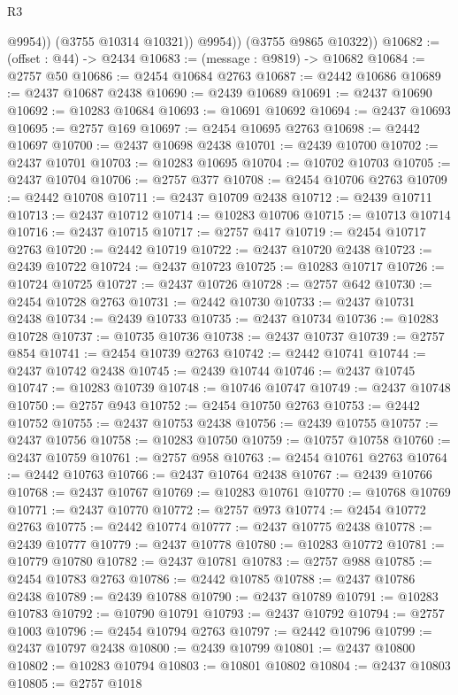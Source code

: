\begin{lexlean}{R3}
\begin{coremodule}
                @9954))
            (@3755 @10314 @10321))
          @9954))
      (@3755 @9865 @10322))
@10682 := (offset : @44) -> @2434
@10683 := (message : @9819) -> @10682
@10684 := @2757 @50
@10686 := @2454 @10684 @2763
@10687 := @2442 @10686
@10689 := @2437 @10687 @2438
@10690 := @2439 @10689
@10691 := @2437 @10690
@10692 := @10283 @10684
@10693 := @10691 @10692
@10694 := @2437 @10693
@10695 := @2757 @169
@10697 := @2454 @10695 @2763
@10698 := @2442 @10697
@10700 := @2437 @10698 @2438
@10701 := @2439 @10700
@10702 := @2437 @10701
@10703 := @10283 @10695
@10704 := @10702 @10703
@10705 := @2437 @10704
@10706 := @2757 @377
@10708 := @2454 @10706 @2763
@10709 := @2442 @10708
@10711 := @2437 @10709 @2438
@10712 := @2439 @10711
@10713 := @2437 @10712
@10714 := @10283 @10706
@10715 := @10713 @10714
@10716 := @2437 @10715
@10717 := @2757 @417
@10719 := @2454 @10717 @2763
@10720 := @2442 @10719
@10722 := @2437 @10720 @2438
@10723 := @2439 @10722
@10724 := @2437 @10723
@10725 := @10283 @10717
@10726 := @10724 @10725
@10727 := @2437 @10726
@10728 := @2757 @642
@10730 := @2454 @10728 @2763
@10731 := @2442 @10730
@10733 := @2437 @10731 @2438
@10734 := @2439 @10733
@10735 := @2437 @10734
@10736 := @10283 @10728
@10737 := @10735 @10736
@10738 := @2437 @10737
@10739 := @2757 @854
@10741 := @2454 @10739 @2763
@10742 := @2442 @10741
@10744 := @2437 @10742 @2438
@10745 := @2439 @10744
@10746 := @2437 @10745
@10747 := @10283 @10739
@10748 := @10746 @10747
@10749 := @2437 @10748
@10750 := @2757 @943
@10752 := @2454 @10750 @2763
@10753 := @2442 @10752
@10755 := @2437 @10753 @2438
@10756 := @2439 @10755
@10757 := @2437 @10756
@10758 := @10283 @10750
@10759 := @10757 @10758
@10760 := @2437 @10759
@10761 := @2757 @958
@10763 := @2454 @10761 @2763
@10764 := @2442 @10763
@10766 := @2437 @10764 @2438
@10767 := @2439 @10766
@10768 := @2437 @10767
@10769 := @10283 @10761
@10770 := @10768 @10769
@10771 := @2437 @10770
@10772 := @2757 @973
@10774 := @2454 @10772 @2763
@10775 := @2442 @10774
@10777 := @2437 @10775 @2438
@10778 := @2439 @10777
@10779 := @2437 @10778
@10780 := @10283 @10772
@10781 := @10779 @10780
@10782 := @2437 @10781
@10783 := @2757 @988
@10785 := @2454 @10783 @2763
@10786 := @2442 @10785
@10788 := @2437 @10786 @2438
@10789 := @2439 @10788
@10790 := @2437 @10789
@10791 := @10283 @10783
@10792 := @10790 @10791
@10793 := @2437 @10792
@10794 := @2757 @1003
@10796 := @2454 @10794 @2763
@10797 := @2442 @10796
@10799 := @2437 @10797 @2438
@10800 := @2439 @10799
@10801 := @2437 @10800
@10802 := @10283 @10794
@10803 := @10801 @10802
@10804 := @2437 @10803
@10805 := @2757 @1018

\end{coremodule}
\end{lexlean}
